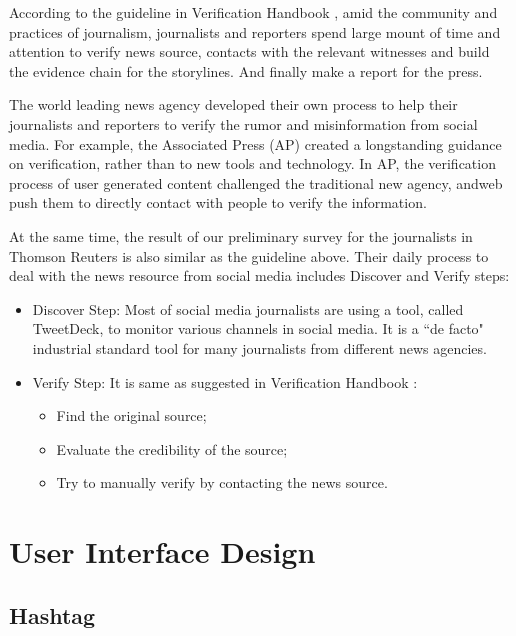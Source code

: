According to the guideline in Verification Handbook \cite{Silverman2014}, amid the community and practices of journalism, journalists and reporters spend large mount of time and attention to verify news source, contacts with the relevant witnesses and build the evidence chain for the storylines. And finally make a report for the press. 

The world leading news agency developed their own process to help their journalists and reporters to verify the rumor and misinformation from social media. For example, the Associated Press (AP) created a longstanding guidance on verification, rather than to new tools and technology. In AP, the verification process of user generated content challenged the traditional new agency, andweb push them to directly contact with people to verify the information. 

At the same time, the result of our preliminary survey for the journalists in Thomson Reuters is also similar as the guideline above. Their daily process to deal with the news resource from social media includes Discover and Verify steps:

\begin{itemize}
  \item Discover Step: Most of social media journalists are using a tool, called TweetDeck, to monitor various channels in social media. It is a ``de facto" industrial standard tool for many journalists from different news agencies. 
\item Verify Step: It is same as suggested in Verification Handbook \cite{Silverman2014}: 
\begin{itemize}
  \item Find the original source; 
  \item Evaluate the credibility of the source;
  \item Try to manually verify by contacting the news source.
\end{itemize}
\end{itemize}





\section{User Interface Design}


\subsection{Hashtag }




